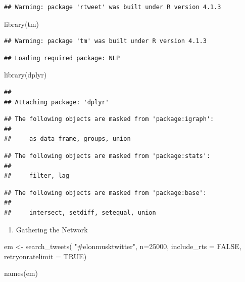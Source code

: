 \documentclass[
]{article}
\newenvironment{Shaded}{\begin{snugshade}}{\end{snugshade}}
\newcommand{\AttributeTok}[1]{\textcolor[rgb]{0.77,0.63,0.00}{#1}}
\newcommand{\ConstantTok}[1]{\textcolor[rgb]{0.00,0.00,0.00}{#1}}
\newcommand{\DecValTok}[1]{\textcolor[rgb]{0.00,0.00,0.81}{#1}}
\newcommand{\FunctionTok}[1]{\textcolor[rgb]{0.00,0.00,0.00}{#1}}
\newcommand{\NormalTok}[1]{#1}
\newcommand{\OtherTok}[1]{\textcolor[rgb]{0.56,0.35,0.01}{#1}}
\newcommand{\StringTok}[1]{\textcolor[rgb]{0.31,0.60,0.02}{#1}}
\providecommand{\tightlist}{%
  \setlength{\itemsep}{0pt}\setlength{\parskip}{0pt}}
\begin{document}
\begin{verbatim}
## Warning: package 'rtweet' was built under R version 4.1.3
\end{verbatim}

\begin{Shaded}
\begin{Highlighting}[]
\FunctionTok{library}\NormalTok{(}\StringTok{\textquotesingle{}tm\textquotesingle{}}\NormalTok{)}
\end{Highlighting}
\end{Shaded}

\begin{verbatim}
## Warning: package 'tm' was built under R version 4.1.3
\end{verbatim}

\begin{verbatim}
## Loading required package: NLP
\end{verbatim}

\begin{Shaded}
\begin{Highlighting}[]
\FunctionTok{library}\NormalTok{(}\StringTok{\textquotesingle{}dplyr\textquotesingle{}}\NormalTok{)}
\end{Highlighting}
\end{Shaded}

\begin{verbatim}
## 
## Attaching package: 'dplyr'
\end{verbatim}

\begin{verbatim}
## The following objects are masked from 'package:igraph':
## 
##     as_data_frame, groups, union
\end{verbatim}

\begin{verbatim}
## The following objects are masked from 'package:stats':
## 
##     filter, lag
\end{verbatim}

\begin{verbatim}
## The following objects are masked from 'package:base':
## 
##     intersect, setdiff, setequal, union
\end{verbatim}

\begin{enumerate}
\def\labelenumi{\arabic{enumi}.}
\tightlist
\item
  Gathering the Network
\end{enumerate}

\begin{Shaded}
\begin{Highlighting}[]
\NormalTok{em }\OtherTok{\textless{}{-}} \FunctionTok{search\_tweets}\NormalTok{(}
  \StringTok{"\#elonmusktwitter"}\NormalTok{, }\AttributeTok{n=}\DecValTok{25000}\NormalTok{, }\AttributeTok{include\_rts =} \ConstantTok{FALSE}\NormalTok{, }\AttributeTok{retryonratelimit =} \ConstantTok{TRUE}\NormalTok{)}

\FunctionTok{names}\NormalTok{(em)}
\end{Highlighting}
\end{Shaded}
\end{document}
